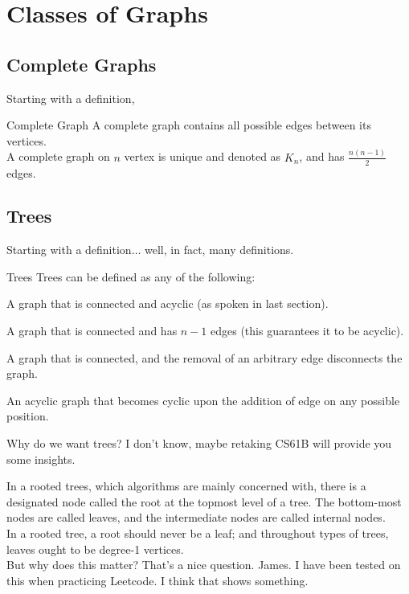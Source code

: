 \section{Classes of Graphs}

\subsection{Complete Graphs}
Starting with a definition,
\begin{ln-define}{Complete Graph}{}
    A complete graph contains all possible edges between its vertices. \\
    A complete graph on $n$ vertex is unique and denoted as $K_n$, and has $\frac{n(n-1)}{2} $edges.
\end{ln-define}

\subsection{Trees}
Starting with a definition$\dots$ well, in fact, many definitions.
\begin{ln-define}{Trees}{}
    Trees can be defined as any of the following:
    \begin{bindenum}
        \item A graph that is connected and acyclic (as spoken in last section).
        \item A graph that is connected and has $n - 1$ edges (this guarantees it to be acyclic).
        \item A graph that is connected, and the removal of an arbitrary edge disconnects the graph.
        \item An acyclic graph that becomes cyclic upon the addition of edge on any possible position.
    \end{bindenum}
\end{ln-define}
Why do we want trees? I don't know, maybe retaking CS61B will provide you some insights.

In a rooted trees, which algorithms are mainly concerned with, there is a designated node called the root at the topmost level of a tree. The bottom-most nodes are called leaves, and the intermediate nodes are called internal nodes. \\
In a rooted tree, a root should never be a leaf; and throughout types of trees, leaves ought to be degree-1 vertices. \\
But why does this matter? That's a nice question. James. I have been tested on this when practicing Leetcode. I think that shows something.

